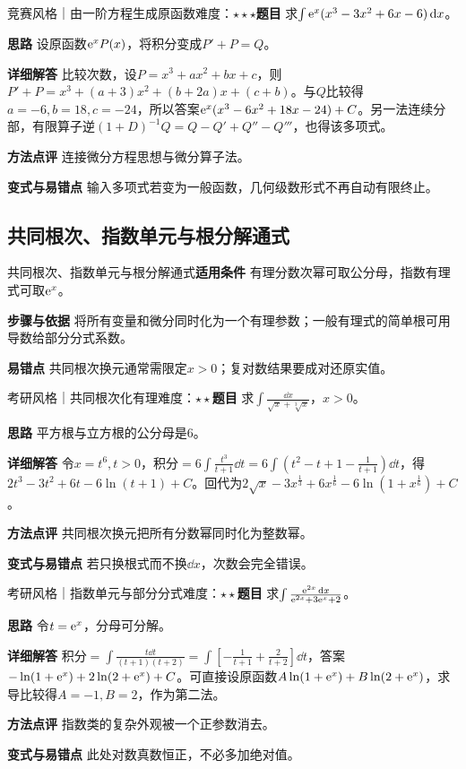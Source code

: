 \begin{example}{竞赛风格｜由一阶方程生成原函数}{难度：$\star\star\star$}\label{deep:ex:integral_source_deep:odeint}\textbf{题目} 求$\int \mathrm{e}^x(x^3-3x^2+6x-6)\mathop{}\!\mathrm{d} x$。\par\textbf{思路} 设原函数$\mathrm{e}^xP(x)$，将积分变成$P'+P=Q$。\par\textbf{详细解答} 比较次数，设$P=x^3+ax^2+bx+c$，则$P'+P=x^3+(a+3)x^2+(b+2a)x+(c+b)$。与$Q$比较得$a=-6,b=18,c=-24$，所以答案$\mathrm{e}^x(x^3-6x^2+18x-24)+C$。另一法连续分部，有限算子逆$(1+D)^{-1}Q=Q-Q'+Q''-Q'''$，也得该多项式。\par\textbf{方法点评} 连接微分方程思想与微分算子法。\par\textbf{变式与易错点} 输入多项式若变为一般函数，几何级数形式不再自动有限终止。\end{example}

\subsection{共同根次、指数单元与根分解通式}\label{deep:integral_source_deep:unitroot}

\begin{method}{共同根次、指数单元与根分解通式}\textbf{适用条件} 有理分数次幂可取公分母，指数有理式可取$\mathrm{e}^x$。\par\textbf{步骤与依据} 将所有变量和微分同时化为一个有理参数；一般有理式的简单根可用导数给部分分式系数。\par\textbf{易错点} 共同根次换元通常需限定$x>0$；复对数结果要成对还原实值。\end{method}

\begin{example}{考研风格｜共同根次化有理}{难度：$\star\star$}\label{deep:ex:integral_source_deep:lcmroot}\textbf{题目} 求$\int\frac{\dd x}{\sqrt x+\sqrt[3]x}$，$x>0$。\par\textbf{思路} 平方根与立方根的公分母是6。\par\textbf{详细解答} 令$x=t^6,t>0$，积分$=6\int \frac{t^3}{t+1}\dd t=6\int(t^2-t+1-\frac{1}{t+1})\dd t$，得$2t^3-3t^2+6t-6\ln(t+1)+C$。回代为$2\sqrt x-3x^{\frac{1}{3}}+6x^{\frac{1}{6}}-6\ln(1+x^{\frac{1}{6}})+C$。\par\textbf{方法点评} 共同根次换元把所有分数幂同时化为整数幂。\par\textbf{变式与易错点} 若只换根式而不换$\dd x$，次数会完全错误。\end{example}

\begin{example}{考研风格｜指数单元与部分分式}{难度：$\star\star$}\label{deep:ex:integral_source_deep:expunit}\textbf{题目} 求$\int\frac{\mathrm{e}^{2x}\mathop{}\!\mathrm{d} x}{\mathrm{e}^{2x}+3\mathrm{e}^x+2}$。\par\textbf{思路} 令$t=\mathrm{e}^x$，分母可分解。\par\textbf{详细解答} 积分$=\int \frac{t\dd t}{(t+1)(t+2)}=\int[-\frac{1}{t+1}+\frac{2}{t+2}]\dd t$，答案$-\ln(1+\mathrm{e}^x)+2\ln(2+\mathrm{e}^x)+C$。可直接设原函数$A\ln(1+\mathrm{e}^x)+B\ln(2+\mathrm{e}^x)$，求导比较得$A=-1,B=2$，作为第二法。\par\textbf{方法点评} 指数类的复杂外观被一个正参数消去。\par\textbf{变式与易错点} 此处对数真数恒正，不必多加绝对值。\end{example}


